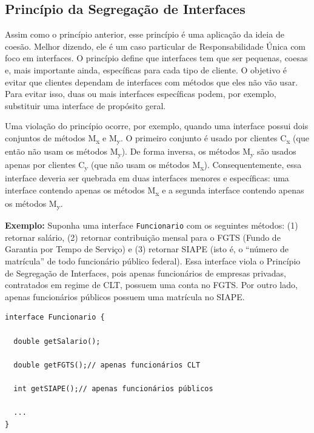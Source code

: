 \documentclass[
  11pt,
  twoside]{book}
\newcommand{\passthrough}[1]{#1}
\begin{document}
\hypertarget{princuxedpio-da-segregauxe7uxe3o-de-interfaces}{%
\subsection{Princípio da Segregação de
Interfaces}\label{princuxedpio-da-segregauxe7uxe3o-de-interfaces}}


Assim como o princípio anterior, esse princípio é uma aplicação da ideia
de coesão. Melhor dizendo, ele é um caso particular de Responsabilidade
Única com foco em interfaces. O princípio define que interfaces tem que
ser pequenas, coesas e, mais importante ainda, específicas para cada
tipo de cliente. O objetivo é evitar que clientes dependam de interfaces
com métodos que eles não vão usar. Para evitar isso, duas ou mais
interfaces específicas podem, por exemplo, substituir uma interface de
propósito geral.

Uma violação do princípio ocorre, por exemplo, quando uma interface
possui dois conjuntos de métodos M\textsubscript{x} e
M\textsubscript{y}. O primeiro conjunto é usado por clientes
C\textsubscript{x} (que então não usam os métodos M\textsubscript{y}).
De forma inversa, os métodos M\textsubscript{y} são usados apenas por
clientes C\textsubscript{y} (que não usam os métodos
M\textsubscript{x}). Consequentemente, essa interface deveria ser
quebrada em duas interfaces menores e específicas: uma interface
contendo apenas os métodos M\textsubscript{x} e a segunda interface
contendo apenas os métodos M\textsubscript{y}.

\textbf{Exemplo:} Suponha uma interface
\passthrough{\lstinline!Funcionario!} com os seguintes métodos: (1)
retornar salário, (2) retornar contribuição mensal para o FGTS (Fundo de
Garantia por Tempo de Serviço) e (3) retornar SIAPE (isto é, o ``número
de matrícula'' de todo funcionário público federal). Essa interface
viola o Princípio de Segregação de Interfaces, pois apenas funcionários
de empresas privadas, contratados em regime de CLT, possuem uma conta no
FGTS. Por outro lado, apenas funcionários públicos possuem uma matrícula
no SIAPE.

\newpage

\begin{lstlisting}
interface Funcionario {

  double getSalario();

  double getFGTS();// apenas funcionários CLT

  int getSIAPE();// apenas funcionários públicos

  ...
}
\end{lstlisting}
\end{document}

